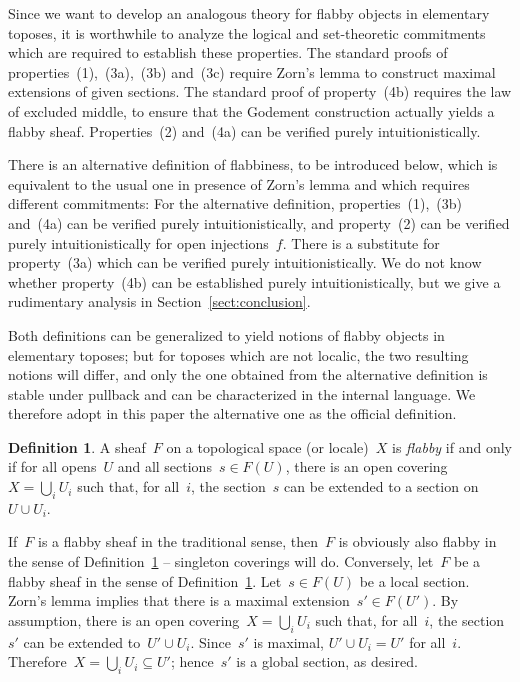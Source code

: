 \documentclass[oneside]{amsart}
\theoremstyle{definition}
\newtheorem{defn}{Definition}[section]
\theoremstyle{plain}
\theoremstyle{remark}
\renewcommand{\_}{\mathpunct{.}\,}
\begin{document}
Since we want to develop an analogous theory for flabby objects in elementary
toposes, it is worthwhile to analyze the logical and set-theoretic commitments
which are required to establish these properties. The standard proofs of
properties~(1),~(3a),~(3b) and~(3c) require Zorn's lemma to construct maximal
extensions of given sections. The standard proof of property~(4b) requires the
law of excluded middle, to ensure that the Godement construction actually
yields a flabby sheaf. Properties~(2) and~(4a) can be verified purely
intuitionistically.

There is an alternative definition of flabbiness, to be introduced below, which
is equivalent to the usual one in presence of Zorn's lemma and which
requires different commitments: For the alternative definition,
properties~(1),~(3b) and~(4a) can be verified purely intuitionistically, and
property~(2) can be verified purely intuitionistically for open injections~$f$.
There is a substitute for property~(3a) which can be verified purely
intuitionistically. We do not know whether property~(4b) can be established
purely intuitionistically, but we give a rudimentary analysis in
Section~\ref{sect:conclusion}.

Both definitions can be generalized to yield notions of flabby objects in
elementary toposes; but for toposes which are not localic, the two resulting
notions will differ, and only the one obtained from the alternative definition
is stable under pullback and
can be characterized in the internal language. We therefore adopt in this paper the
alternative one as the official definition.

\begin{defn}\label{defn:flabby-sheaf}
A sheaf~$F$ on a topological space (or locale)~$X$ is \emph{flabby}
if and only if for all opens~$U$ and all sections~$s \in F(U)$, there is an
open covering~$X = \bigcup_i U_i$ such that, for all~$i$, the section~$s$ can
be extended to a section on~$U \cup U_i$.\end{defn}

If~$F$ is a flabby sheaf in the traditional sense, then~$F$ is obviously also
flabby in the sense of Definition~\ref{defn:flabby-sheaf} -- singleton
coverings will do. Conversely, let~$F$ be a flabby sheaf in the sense of
Definition~\ref{defn:flabby-sheaf}. Let~$s \in F(U)$ be a local section. Zorn's
lemma implies that there is a maximal extension~$s' \in F(U')$. By assumption,
there is an open covering~$X = \bigcup_i U_i$ such that, for all~$i$, the
section~$s'$ can be extended to~$U' \cup U_i$. Since~$s'$ is maximal, $U' \cup
U_i = U'$ for all~$i$. Therefore~$X = \bigcup_i U_i \subseteq U'$; hence~$s'$ is a
global section, as desired.
\end{document}
